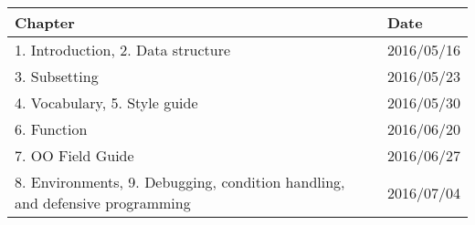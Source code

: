 \documentclass[]{article}
\begin{document}
\begin{longtable}[]{@{}ll@{}}
\toprule
\begin{minipage}[b]{0.73\columnwidth}\raggedright\strut
Chapter\strut
\end{minipage} & \begin{minipage}[b]{0.04\columnwidth}\raggedright\strut
Date\strut
\end{minipage}\tabularnewline
\midrule
\endhead
\begin{minipage}[t]{0.73\columnwidth}\raggedright\strut
1. Introduction, 2. Data structure\strut
\end{minipage} & \begin{minipage}[t]{0.04\columnwidth}\raggedright\strut
2016/05/16\strut
\end{minipage}\tabularnewline
\begin{minipage}[t]{0.73\columnwidth}\raggedright\strut
3. Subsetting\strut
\end{minipage} & \begin{minipage}[t]{0.04\columnwidth}\raggedright\strut
2016/05/23\strut
\end{minipage}\tabularnewline
\begin{minipage}[t]{0.73\columnwidth}\raggedright\strut
4. Vocabulary, 5. Style guide\strut
\end{minipage} & \begin{minipage}[t]{0.04\columnwidth}\raggedright\strut
2016/05/30\strut
\end{minipage}\tabularnewline
\begin{minipage}[t]{0.73\columnwidth}\raggedright\strut
6. Function\strut
\end{minipage} & \begin{minipage}[t]{0.04\columnwidth}\raggedright\strut
2016/06/20\strut
\end{minipage}\tabularnewline
\begin{minipage}[t]{0.73\columnwidth}\raggedright\strut
7. OO Field Guide\strut
\end{minipage} & \begin{minipage}[t]{0.04\columnwidth}\raggedright\strut
2016/06/27\strut
\end{minipage}\tabularnewline
\begin{minipage}[t]{0.73\columnwidth}\raggedright\strut
8. Environments, 9. Debugging, condition handling, and defensive
programming\strut
\end{minipage} & \begin{minipage}[t]{0.04\columnwidth}\raggedright\strut
2016/07/04\strut

\end{minipage}
\end{longtable}
\end{document}
